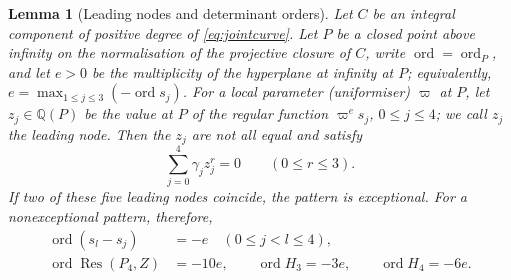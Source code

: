 \documentclass[11pt]{article}
\newtheorem{lemma}[theorem]{Lemma}
\theoremstyle{definition}
\theoremstyle{remark}
\begin{document}
\begin{lemma}[Leading nodes and determinant orders]\label{lem:jointleading}
Let $C$ be an integral component of positive degree of
\eqref{eq:jointcurve}. Let $P$ be a closed point above infinity on the
normalisation of the projective closure of $C$, write
$\operatorname{ord}=\operatorname{ord}_P$, and let $e>0$ be the
multiplicity of the hyperplane at infinity at $P$; equivalently,
$e=\max_{1\le j\le3}(-\operatorname{ord}s_j)$.
For a local parameter (uniformiser) $\varpi$ at $P$, let $z_j\in\mathbb Q(P)$ be the value
at $P$ of the regular function $\varpi^es_j$, $0\le j\le4$; we call $z_j$ the
\emph{leading node}.
Then the $z_j$ are not all equal and satisfy
\begin{equation}\label{eq:joint-leading-moments}
 \sum_{j=0}^4\gamma_jz_j^r=0\qquad(0\le r\le3).
\end{equation}
If two of these five leading nodes coincide, the pattern is exceptional.
For a nonexceptional pattern, therefore,
\begin{align}
 \operatorname{ord}(s_l-s_j)&=-e\quad(0\le j<l\le4),\label{eq:joint-node-orders}\\
 \operatorname{ord}\operatorname{Res}(P_4,Z)&=-10e,\qquad
 \operatorname{ord}H_3=-3e,\qquad \operatorname{ord}H_4=-6e.\label{eq:joint-determinant-orders}
\end{align}
\end{lemma}
\end{document}
